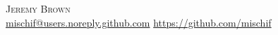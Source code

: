 \documentclass[letterpaper, oneside, final, 10pt]{scrartcl} %
\begin{document}
\begin{center} %


{\fontsize{28}{28}\selectfont\scshape Jeremy Brown}\\ %
{\Large\Letter} \href{mailto:mischif@users.noreply.github.com}{mischif@users.noreply.github.com} \hfill {\Large\ComputerMouse} \href{https://github.com/mischif}{https://github.com/mischif}\\

\vspace{-16pt} %







\end{center}
\end{document}

